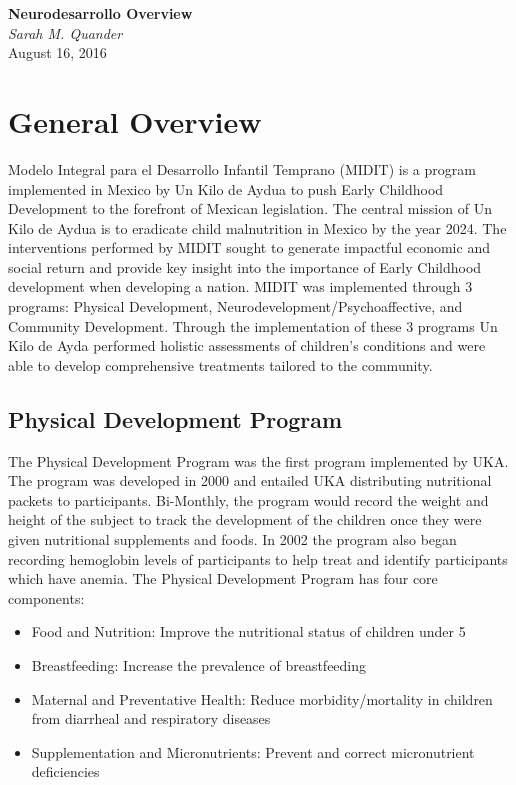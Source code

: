 \documentclass{article}
\begin{document}
   \begin{center}
      \Large\textbf{Neurodesarrollo Overview}\\
      \large\textit{Sarah M. Quander} \\
      \large{August 16, 2016}
   \end{center}

\section{General Overview}
Modelo Integral para el Desarrollo Infantil Temprano (MIDIT) is a program implemented in Mexico by Un Kilo de Aydua to push Early Childhood Development to the forefront of Mexican legislation. The central mission of Un Kilo de Aydua is to eradicate child malnutrition in Mexico by the year 2024. The interventions performed by MIDIT sought to generate impactful economic and social return and provide key insight into the importance of Early Childhood development when developing a nation. MIDIT was implemented through 3 programs: Physical Development, Neurodevelopment/Psychoaffective, and Community Development. Through the implementation of these 3 programs Un Kilo de Ayda performed holistic assessments of children's conditions and were able to develop comprehensive treatments tailored to the community. 

\subsection{Physical Development Program}
The Physical Development Program was the first program implemented by UKA. The program was developed in 2000 and entailed UKA distributing nutritional packets to participants. Bi-Monthly, the program would record the weight and height of the subject to track the development of the children once they were given nutritional supplements and foods. In 2002 the program also began recording hemoglobin levels of participants to help treat and identify participants which have anemia. The Physical Development Program has four core components:
\begin{itemize}
\item Food and Nutrition: Improve the nutritional status of children under 5
\item Breastfeeding: Increase the prevalence of breastfeeding 
\item Maternal and Preventative Health: Reduce morbidity/mortality in children from diarrheal and respiratory diseases
\item Supplementation and Micronutrients: Prevent and correct micronutrient deficiencies  
\end{itemize}
\end{document}
